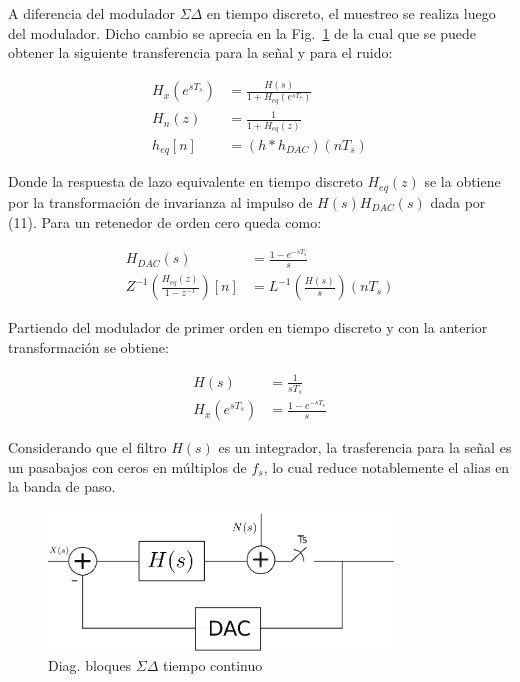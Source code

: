 \documentclass[a4paper,conference]{IEEEtran}
\begin{document}
A diferencia del modulador $\Sigma\Delta$ en tiempo discreto, el muestreo se realiza luego del modulador. Dicho cambio se aprecia en la Fig.~\ref{fig:SDTC} de la cual que se puede obtener la siguiente transferencia para la señal y para el ruido:


\begin{align}
H_x(e^{sT_s}) &= \frac{H(s)}{1+H_{eq}(e^{sT_s})} \\
H_n(z) &= \frac{1}{1+H_{eq}(z)} \\
h_{eq}[n] &= (h\ast h_{DAC})(nT_s)
\end{align}

Donde la respuesta de lazo equivalente en tiempo discreto $H_{eq}(z)$ se la obtiene por la transformaci\'on de invarianza al impulso\cite{DSP:Pro-Man} de $H(s)H_{DAC}(s)$ dada por (11). Para un retenedor de orden cero queda como:

\begin{align}
 H_{DAC}(s)&=\frac{1-e^{-sT_s}}{s}\\
 Z^{-1}(\frac{H_{eq}(z)}{1-z^{-1}})[n]&=L^{-1}(\frac{H(s)}{s})(nT_s)
\end{align}

Partiendo del modulador de primer orden en tiempo discreto y con la anterior transformaci\'on se obtiene:

\begin{align}
 H(s)&=\frac{1}{sT_s}\\
 H_x(e^{sT_s})&= \frac{1-e^{-sT_s}}{s}
\end{align}

Considerando que el filtro $H(s)$ es un integrador, la trasferencia para la se\~nal es un pasabajos con ceros en múltiplos de $f_s$, lo cual reduce notablemente el alias en la banda de paso.

\begin{figure}[!t]
\centering
\includegraphics[width=3.6in]{Sigma-Delta_Tiempo_Continuo}
\caption{Diag. bloques $\Sigma\Delta$ tiempo continuo}
\label{fig:SDTC}
\end{figure}
\end{document}
